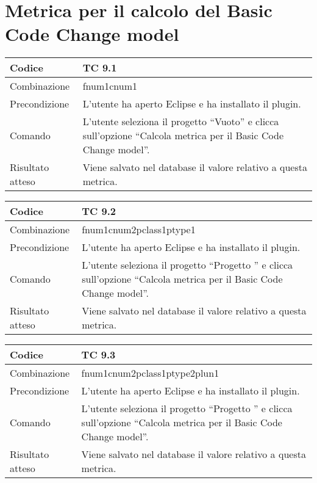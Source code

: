 \clearpage

\section{Metrica per il calcolo del Basic Code Change model}

\begin{table}[ht]
\begin{tabular}{|p{3cm}|p{9cm}|}
\hline
\cellcolor{lightgray}Codice				& TC 9.1								\\
\hline
\cellcolor{lightgray}Combinazione		& fnum1cnum1									\\
\hline
\cellcolor{lightgray}Precondizione		& L'utente ha aperto Eclipse e ha installato il plugin.		\\
\hline
\cellcolor{lightgray}Comando			& L'utente seleziona il progetto ``Vuoto''  e clicca sull'opzione ``Calcola metrica per il Basic Code Change model''.	\\
\hline
\cellcolor{lightgray}Risultato atteso	& Viene salvato nel database il valore relativo a questa metrica.\\
\hline
\end{tabular}
\end{table}


\begin{table}[ht]
\begin{tabular}{|p{3cm}|p{9cm}|}
\hline
\cellcolor{lightgray}Codice				& TC 9.2								\\
\hline
\cellcolor{lightgray}Combinazione		& fnum1cnum2pclass1ptype1									\\
\hline
\cellcolor{lightgray}Precondizione		& L'utente ha aperto Eclipse e ha installato il plugin.		\\
\hline
\cellcolor{lightgray}Comando			& L'utente seleziona il progetto ``Progetto ''  e clicca sull'opzione ``Calcola metrica per il Basic Code Change model''.	\\
\hline
\cellcolor{lightgray}Risultato atteso	& Viene salvato nel database il valore relativo a questa metrica.\\
\hline
\end{tabular}
\end{table}


\begin{table}[ht]
\begin{tabular}{|p{3cm}|p{9cm}|}
\hline
\cellcolor{lightgray}Codice				& TC 9.3								\\
\hline
\cellcolor{lightgray}Combinazione		& fnum1cnum2pclass1ptype2plun1									\\
\hline
\cellcolor{lightgray}Precondizione		& L'utente ha aperto Eclipse e ha installato il plugin.		\\
\hline
\cellcolor{lightgray}Comando			& L'utente seleziona il progetto ``Progetto ''  e clicca sull'opzione ``Calcola metrica per il Basic Code Change model''.	\\
\hline
\cellcolor{lightgray}Risultato atteso	& Viene salvato nel database il valore relativo a questa metrica.\\
\hline
\end{tabular}
\end{table}


